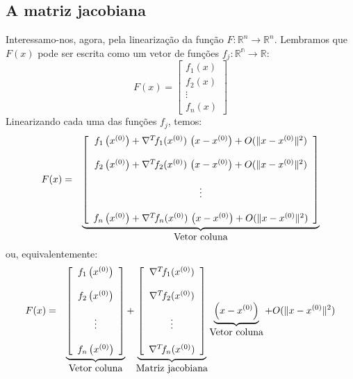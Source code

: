 \documentclass[main.tex]{subfiles}
\begin{document}
\subsection{A matriz jacobiana}
Interessamo-nos, agora, pela linearização da função $F:\mathbb{R}^n\to \mathbb{R}^n$. Lembramos que $F(x)$ pode ser escrita como um vetor de funções $f_j:\mathbb{R^n}\to\mathbb{R}$:
\begin{equation*}
  F(x)=\left[\begin{matrix}
      f_1(x)\\
      f_2(x)\\
      \vdots\\
      f_n(x)
    \end{matrix}\right]
\end{equation*}
Linearizando cada uma das funções $f_j$, temos:
\begin{eqnarray*}
F(x)&=&\underbrace{\left[
\begin{array}{c}
f_1\left(x^{(0)}\right)+\nabla^T\! f_1(x^{(0)})\!~\left(x-x^{(0)}\right)   + O(\|x-x^{(0)}\|^2)\\~\\
f_2\left(x^{(0)}\right)+\nabla^T\! f_2(x^{(0)})\!~\left(x-x^{(0)}\right)   + O(\|x-x^{(0)}\|^2)\\~\\
\vdots\\~\\
f_n\left(x^{(0)}\right)+\nabla^T\! f_n(x^{(0)})\!~\left(x-x^{(0)}\right)   + O(\|x-x^{(0)}\|^2)
\end{array}
\right]}_{\hbox{Vetor coluna}}
\end{eqnarray*}
ou, equivalentemente:
\begin{eqnarray*}
 F(x) &=&\underbrace{\left[
\begin{array}{c}
f_1\left(x^{(0)}\right)\\~\\
f_2\left(x^{(0)}\right)\\~\\
\vdots\\~\\
f_n\left(x^{(0)}\right)
\end{array}
\right]}_{\hbox{Vetor coluna}}+
\underbrace{\left[
\begin{array}{c}\nabla^T\! f_1(x^{(0)})\\~~\\
\nabla^T\! f_2(x^{(0)})\\~~\\
\vdots\\~~\\
\nabla^T\! f_n(x^{(0)})
\end{array}
\right]}_{\hbox{Matriz jacobiana}}\underbrace{\left(x-x^{(0)}\right)}_{\hbox{Vetor coluna}}+O(\|x-x^{(0)}\|^2)
\end{eqnarray*}
\end{document}
